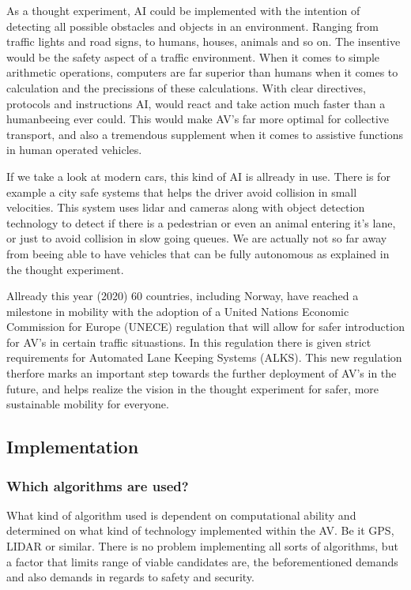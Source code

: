 \documentclass[conference]{IEEEtran}
\begin{document}
	As a thought experiment, AI could be implemented with the intention of detecting all possible 
	obstacles and objects in an environment. Ranging from traffic lights and road signs, to humans,
	houses, animals and so on. The insentive would be the safety aspect of a traffic environment. 
	When it comes to simple arithmetic operations, computers are far superior than humans when it comes 
	to calculation and the precissions of these calculations. With clear directives, protocols and instructions
	AI, would react and take action much faster than a humanbeeing ever could. This would make 
	AV's far more optimal for collective transport, and also a tremendous supplement when it comes to 
	assistive functions in human operated vehicles.

	If we take a look at modern cars, this kind of AI is allready in use. There is for example a city safe systems that 
	helps the driver avoid collision in small velocities. This system uses lidar and cameras along with object detection technology 
	to detect if there is a pedestrian or even an animal entering it's lane, or just to avoid collision in slow going queues. 
	We are actually not so far away from beeing able to have vehicles that can be fully autonomous as explained in the thought experiment. 

	Allready this year (2020) 60 countries, including Norway, have reached a milestone in mobility with the adoption of a United Nations Economic 
	Commission for Europe (UNECE) regulation that will allow for safer introduction for AV's in certain traffic situastions. In this regulation 
	there is given strict requirements for Automated Lane Keeping Systems (ALKS). This new regulation therfore marks an important step towards 
	the further deployment of AV's in the future, and helps realize the vision in the thought experiment for safer, more sustainable mobility for 
	everyone. \cite{UNECE:LKS}

\subsection{Implementation}	
	\subsubsection{Which algorithms are used?}
		What kind of algorithm used is dependent on computational ability and determined on what kind of technology
		implemented within the AV. Be it GPS, LIDAR or similar. There is no problem
		implementing all sorts of algorithms, but a factor that limits range of viable candidates
		are, the beforementioned demands and also demands in regards to safety and security.
	
\end{document}
